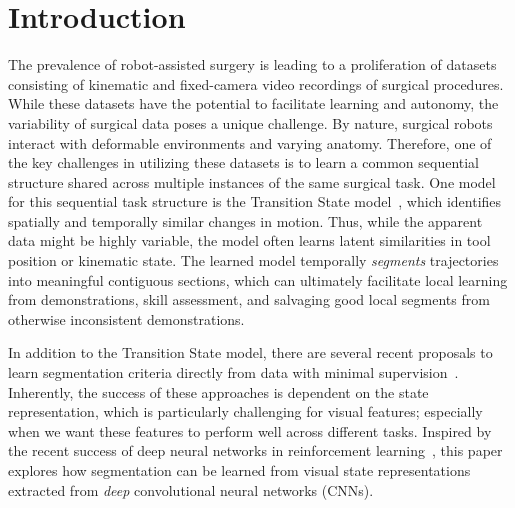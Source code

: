 \documentclass[0-main.tex]{subfiles}
\begin{document}
\section{Introduction}
The prevalence of robot-assisted surgery is leading to a proliferation of datasets consisting of kinematic and fixed-camera video recordings of surgical procedures.
While these datasets have the potential to facilitate learning and autonomy, the variability of surgical data poses a unique challenge.
By nature, surgical robots interact with deformable environments and varying anatomy. 
Therefore, one of the key challenges in utilizing these datasets is to learn a common sequential structure shared across multiple instances of the same surgical task.
One model for this sequential task structure is the Transition State model~\cite{krishnan2015tsc}, which identifies spatially and temporally similar changes in motion.
Thus, while the apparent data might be highly variable, the model often learns latent similarities in tool position or kinematic state.
The learned model temporally \emph{segments} trajectories into meaningful contiguous sections, which can ultimately facilitate local learning from demonstrations, skill assessment, and salvaging good local segments from otherwise inconsistent demonstrations.

In addition to the Transition State model, there are several recent proposals to learn segmentation criteria directly from data with minimal supervision~\cite{calinon2010learning, Niekum2015learning}.
Inherently, the success of these approaches is dependent on the state representation, which is particularly challenging for visual features; especially when we want these features to perform well across different tasks. 
Inspired by the recent success of deep neural networks in reinforcement learning~\cite{levine2015end, lenz2015deep}, this paper explores how segmentation can be learned from visual state representations extracted from \textit{deep} convolutional neural networks (CNNs).
\end{document}
